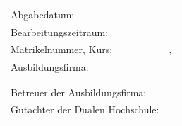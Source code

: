\begin{titlepage}
\begin{center}
	\vfill
	\begin{tabular}{ll}
		Abgabedatum:                     & \abgabe \\[0.2cm]
		Bearbeitungszeitraum:            & \bearbeitungszeitraum \\[0.2cm]
		Matrikelnummer, Kurs:            & \matrikelnr , \kurs \\[0.2cm]
		Ausbildungsfirma:                & \firmaName \\
		                                 & \firmaStrasse \\
		                                 & \firmaPlz \\[0.2cm]
		Betreuer der Ausbildungsfirma:   & \betreuerFirma \\[0.2cm]
		Gutachter der Dualen Hochschule: & \betreuerDhbw \\[2cm]
	\end{tabular} 
\end{center}
\end{titlepage}

